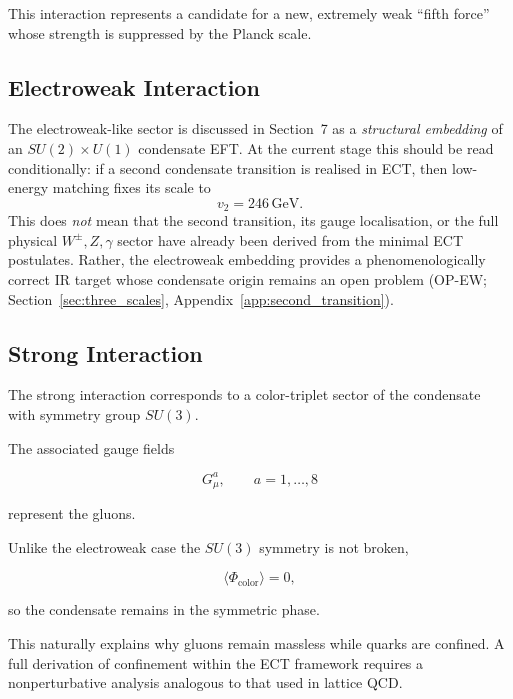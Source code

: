 \documentclass[11pt,a4paper]{article}
\numberwithin{equation}{section}
\begin{document}
This interaction represents a candidate for a new, extremely weak
``fifth force'' whose strength is suppressed by the Planck scale.

\subsection{Electroweak Interaction}

The electroweak-like sector is discussed in Section~7 as a
\emph{structural embedding} of an $SU(2)\times U(1)$ condensate EFT.
At the current stage this should be read conditionally:
if a second condensate transition is realised in ECT, then low-energy
matching fixes its scale to
\begin{equation}
  v_2 = 246\,\mathrm{GeV}.
\end{equation}
This does \emph{not} mean that the second transition, its gauge
localisation, or the full physical $W^\pm,Z,\gamma$ sector have already
been derived from the minimal ECT postulates.
Rather, the electroweak embedding provides a phenomenologically correct
IR target whose condensate origin remains an open problem
(OP-EW; Section~\ref{sec:three_scales}, Appendix~\ref{app:second_transition}).

\subsection{Strong Interaction}

The strong interaction corresponds to a color-triplet sector of the
condensate with symmetry group $SU(3)$.

The associated gauge fields

\begin{equation}
G_\mu^a , \qquad a=1,\dots,8
\end{equation}

represent the gluons.

Unlike the electroweak case the $SU(3)$ symmetry is not broken,

\begin{equation}
\langle \Phi_{\text{color}} \rangle = 0 ,
\end{equation}

so the condensate remains in the symmetric phase.

This naturally explains why gluons remain massless while quarks are
confined.  A full derivation of confinement within the ECT framework
requires a nonperturbative analysis analogous to that used in lattice
QCD.
\end{document}
